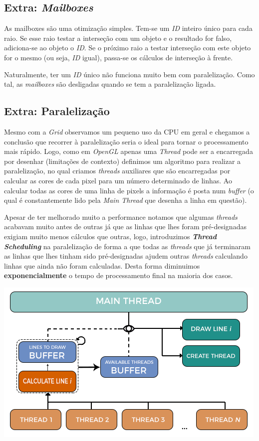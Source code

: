 \documentclass{article}
\begin{document}
        \subsection*{Extra: \textit{Mailboxes}}
            \par
            As mailboxes são uma otimização simples. Tem-se um \textit{ID} inteiro único para cada raio. Se esse raio testar a interseção com um objeto e o resultado for falso, adiciona-se ao objeto o \textit{ID}. Se o próximo raio a testar interseção com este objeto for o mesmo (ou seja, \textit{ID} igual), passa-se os cálculos de interseção à frente.
            \par
            Naturalmente, ter um \textit{ID} único não funciona muito bem com paralelização. Como tal, as \textit{mailboxes} são desligadas quando se tem a paralelização ligada.

        \subsection*{Extra: Paralelização}
            \par
	Mesmo com a \textit{Grid} observamos um pequeno uso da CPU em geral e chegamos a conclusão que recorrer à paralelização seria o ideal para tornar o processamento mais rápido. Logo, como em \textit{OpenGL} apenas uma \textit{Thread} pode ser a encarregada por desenhar (limitações de contexto) definimos um algoritmo para realizar a paralelização, no qual criamos \textit{threads} auxiliares que são encarregadas por calcular as cores de cada pixel para um número determinado de linhas. Ao calcular todas as cores de uma linha de pixels a informação é posta num \textit{buffer} (o qual é constantemente lido pela \textit{Main Thread} que desenha a linha em questão).
\par
	 Apesar de ter melhorado muito a performance notamos que algumas \textit{threads} acabavam muito antes de outras já que as linhas que lhes foram pré-designadas exigiam muito menos cálculos que outras, logo, introduzimos \textbf{\textit{Thread Scheduling}} na paralelização de forma a que todas as \textit{threads} que já terminaram as linhas que lhes tinham sido pré-designadas ajudem outras \textit{threads} calculando linhas que ainda não foram calculadas. Desta forma diminuimos \textbf{exponencialmente} o tempo de processamento final na maioria dos casos.
	\begin{center}
	\includegraphics[scale=0.65]{thread}
	\end{center}
\end{document}
